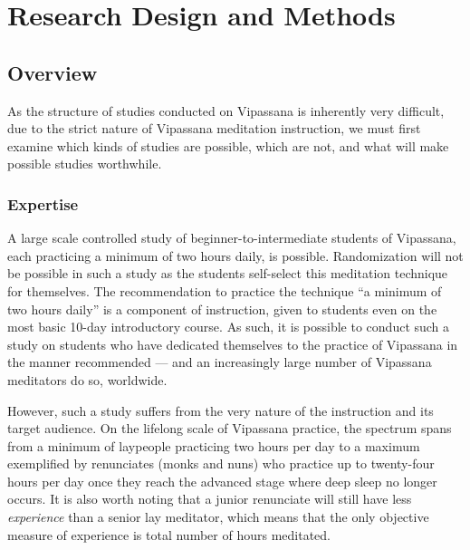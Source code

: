 \documentclass[a4paper, amsfonts, amssymb, amsmath, reprint, showkeys, nofootinbib, twoside]{revtex4-1}
\begin{document}
\section{Research Design and Methods}

\subsection{Overview}

As the structure of studies conducted on Vipassana is inherently very difficult, due to
the strict nature of Vipassana meditation instruction, we must first examine which kinds of
studies are possible, which are not, and what will make possible studies worthwhile.

\subsubsection{Expertise}

A large scale controlled study of beginner-to-intermediate
students of Vipassana, each practicing a minimum of two hours daily, is
possible. Randomization will not be possible in such a study as the students
self-select this meditation technique for themselves. The recommendation to practice
the technique ``a minimum of two hours daily'' is a component of instruction, given
to students even on the most basic 10-day introductory
course. \cite{dhammaorg2017guidelines,goenka2001importance} As such, it is possible
to conduct such a study on students who have dedicated themselves to the practice of
Vipassana in the manner recommended --- and an increasingly large number of Vipassana
meditators do so, worldwide.

However, such a study suffers from the very nature of
the instruction and its target audience. On the lifelong scale of Vipassana
practice, the spectrum spans from a minimum of laypeople practicing two hours per day to
a maximum exemplified by renunciates (monks and nuns) who practice up to twenty-four
hours per day once they
reach the advanced stage where deep sleep no longer occurs. It is
also worth noting that a junior renunciate will still have less \textit{experience}
than a senior lay meditator, which means that the only objective measure of
experience is total number of hours meditated. \cite{goleman2017altered}
\end{document}
